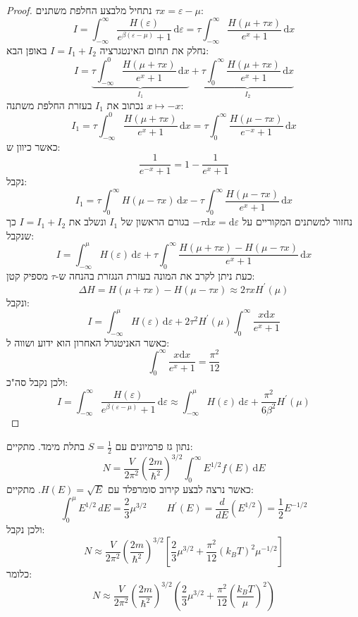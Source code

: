 \documentclass{tstextbook}
\begin{document}
\begin{proof}
נתחיל מלבצע החלפת משתנים \(\tau x=\varepsilon-\mu\):
$$I=\int_{-\infty}^{\infty}{\frac{H(\varepsilon)}{e^{\beta(\varepsilon-\mu)}+1}}\,\mathrm{d}\varepsilon=\tau\int_{-\infty}^{\infty}{\frac{H(\mu+\tau x)}{e^{x}+1}}\,\mathrm{d}x$$
נחלק את תחום האינטגרציה \(I=I_{1}+I_{2}\) באופן הבא:
$$I=\underbrace{\tau\int_{-\infty}^{0}{\frac{H(\mu+\tau x)}{e^{x}+1}}\,\mathrm{d}x}_{I_{1}}+\underbrace{\tau\int_{0}^{\infty}{\frac{H(\mu+\tau x)}{e^{x}+1}}\,\mathrm{d}x}_{I_{2}}$$
נכתוב את \(I_{1}\) בעזרת החלפת משתנה \(x\mapsto-x\):
$$I_{1}=\tau\int_{-\infty}^{0}{\frac{H(\mu+\tau x)}{e^{x}+1}}\,\mathrm{d}x=\tau\int_{0}^{\infty}{\frac{H(\mu-\tau x)}{e^{-x}+1}}\,\mathrm{d}x$$
כאשר כיוון ש:
$${\frac{1}{e^{-x}+1}}=1-{\frac{1}{e^{x}+1}}$$
נקבל:
$$I_{1}=\tau\int_{0}^{\infty}H(\mu-\tau x)\,\mathrm{d}x-\tau\int_{0}^{\infty}{\frac{H(\mu-\tau x)}{e^{x}+1}}\,\mathrm{d}x$$
נחזור למשתנים המקוריים על \(-\tau \mathrm{d}x=\mathrm{d}\varepsilon\) בגורם הראשון של \(I_{1}\) ונשלב את \(I=I_{1}+I_{2}\) כך שנקבל:
$$I=\int_{-\infty}^{\mu}H(\varepsilon)\,\mathrm{d}\varepsilon+\tau\int_{0}^{\infty}{\frac{H(\mu+\tau x)-H(\mu-\tau x)}{e^{x}+1}}\,\mathrm{d}x$$
כעת ניתן לקרב את המונה בעזרת הנגזרת בהנחה ש-\(\tau\) מספיק קטן:
$$\Delta H=H(\mu+\tau x)-H(\mu-\tau x)\approx2\tau x H^{\prime}(\mu)$$
ונקבל:
$$I=\int_{-\infty}^{\mu}H(\varepsilon)\,\mathrm{d}\varepsilon+2\tau^{2}H^{\prime}(\mu)\int_{0}^{\infty}\frac{x\mathrm{d}x}{e^{x}+1}$$
כאשר האניטגרל האחרון הוא ידוע ושווה ל:
$$\int_{0}^{\infty}{\frac{x\mathrm{d}x}{e^{x}+1}}={\frac{\pi^{2}}{12}}$$
ולכן נקבל סה"כ:
$$I=\int_{-\infty}^{\infty}\frac{H(\varepsilon)}{e^{\beta(\varepsilon-\mu)}+1}\,\mathrm{d}\varepsilon\approx\int_{-\infty}^{\mu}H(\varepsilon)\,\mathrm{d}\varepsilon+\frac{\pi^{2}}{6\beta^{2}}H^{\prime}(\mu)$$

\end{proof}
\begin{example}
נתון גז פרמיונים עם \(S=\frac{1}{2}\) בתלת מימד. מתקיים:
$$N={{\frac{V}{2\pi^{2}}\left(\frac{2m}{\hbar^{2}}\right)^{3/2}\int_{0}^{\infty}E^{1/2}f(E)\,\mathrm{d}E}}$$
כאשר נרצה לבצע קירוב סומרפלד עם \(H(E)=\sqrt{ E }\). מתקיים:
$$\int_{0}^{\mu}E^{1/2}\,d E={\frac{2}{3}}\mu^{3/2}\qquad H^{\prime}(E)=\frac{d}{d E}
(E^{1/2})=\frac{1}{2}E^{-1/2}$$
ולכן נקבל:
$$N\approx\frac{V}{2\pi^{2}}\left(\frac{2m}{\hbar^{2}}\right)^{3/2}\left[\frac{2}{3}\mu^{3/2}+\frac{\pi^{2}}{12}(k_{B}T)^{2}\mu^{-1/2}\right]$$
כלומר:
$$N\approx \frac{V}{2\pi^{2}}\left(\frac{2m}{\hbar^{2}}\right)^{3/2}\left( \frac{2}{3}\mu^{3/2}+\frac{\pi^{2}}{12}\left( \frac{k_{B}T}{\mu} \right)^{2} \right)$$

\end{example}
\end{document}
